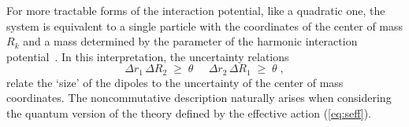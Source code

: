 \documentclass[a4paper,12pt]{article} \tolerance=200
\begin{document}
For more tractable forms of the interaction potential, like
a quadratic one, the system is equivalent to a single particle with
the coordinates of the center of mass $R_k$ and a mass determined by
the parameter of the harmonic interaction potential~\cite{BS}.
In this interpretation, the uncertainty relations
\begin{equation}\label{eq:uncert}
\Delta r_1 \, \Delta R_2 \;\geq\; \theta \;\;\;\;\; \Delta r_2 \, \Delta R_1 \;\geq\; \theta \;,
\end{equation}
relate the `size' of the dipoles to the uncertainty of the center of
mass coordinates.  The noncommutative description naturally arises
when considering the quantum version of the theory defined by the
effective action (\ref{eq:seff}). 
\end{document}

